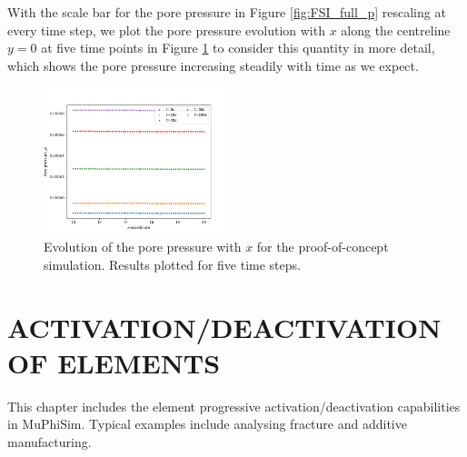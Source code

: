\documentclass[oneside,11pt,times]{book}
\begin{document}
With the scale bar for the pore pressure in Figure \ref{fig:FSI_full_p} rescaling at every time step, we plot the pore pressure evolution with $x$ along the centreline $y=0$ at five time points in Figure \ref{fig:FSI_pore_pressure} to consider this quantity in more detail, which shows the pore pressure increasing steadily with time as we expect. %
\begin{figure}[htbp]
\centering
\includegraphics[width=0.48\textwidth, trim={0cm 0cm 1.5cm 1cm}, clip]{imgs/pore_pressure_FSI_poro_x.png}
\caption{Evolution of the pore pressure with $x$ for the proof-of-concept simulation. Results plotted for five time steps. }
\label{fig:FSI_pore_pressure}
\end{figure}


\appendix
\chapter[APPENDIX A]{ACTIVATION/DEACTIVATION OF ELEMENTS}
This chapter includes the element progressive activation/deactivation capabilities in MuPhiSim. Typical examples include analysing  fracture and additive manufacturing.
\end{document}

